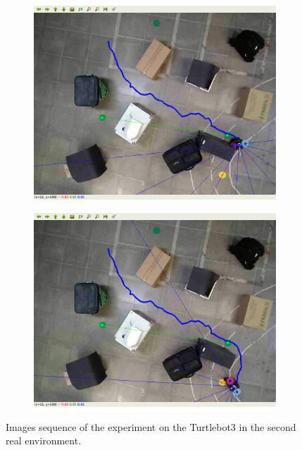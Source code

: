 \begin{figure}[htbp]
\begin{subfigure}[b]{0.115\textwidth}
        \includegraphics[width=\textwidth]{images/test_env2/7.png}
    \end{subfigure}
    \hfill
    \begin{subfigure}[b]{0.115\textwidth}
        \includegraphics[width=\textwidth]{images/test_env2/8.png}
    \end{subfigure}
    \caption{Images sequence of the experiment on the Turtlebot3 in the second real environment.}\label{fig:frames_env2}
\end{figure}